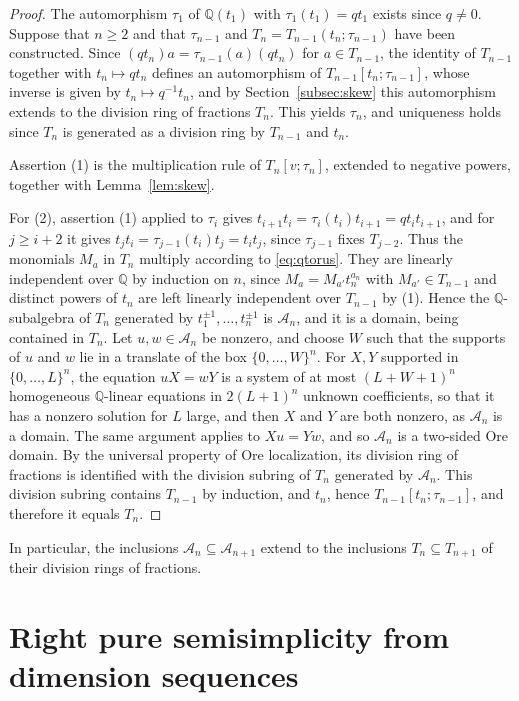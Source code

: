 \documentclass[11pt,a4paper]{amsart}
\numberwithin{equation}{section}
\newcommand{\Q}{\mathbb{Q}}
\begin{document}
\begin{proof}
The automorphism $\tau_1$ of $\Q(t_1)$ with $\tau_1(t_1)=qt_1$ exists since $q\ne0$. Suppose that $n\ge2$ and that $\tau_{n-1}$ and $T_n=T_{n-1}(t_n;\tau_{n-1})$ have been constructed. Since $(qt_n)a=\tau_{n-1}(a)(qt_n)$ for $a\in T_{n-1}$, the identity of $T_{n-1}$ together with $t_n\mapsto qt_n$ defines an automorphism of $T_{n-1}[t_n;\tau_{n-1}]$, whose inverse is given by $t_n\mapsto q^{-1}t_n$, and by Section~\ref{subsec:skew} this automorphism extends to the division ring of fractions $T_n$. This yields $\tau_n$, and uniqueness holds since $T_n$ is generated as a division ring by $T_{n-1}$ and $t_n$.

Assertion (1) is the multiplication rule of $T_n[v;\tau_n]$, extended to negative powers, together with Lemma~\ref{lem:skew}.

For (2), assertion (1) applied to $\tau_i$ gives $t_{i+1}t_i=\tau_i(t_i)t_{i+1}=qt_it_{i+1}$, and for $j\ge i+2$ it gives $t_jt_i=\tau_{j-1}(t_i)t_j=t_it_j$, since $\tau_{j-1}$ fixes $T_{j-2}$. Thus the monomials $M_a$ in $T_n$ multiply according to \eqref{eq:qtorus}. They are linearly independent over $\Q$ by induction on $n$, since $M_a=M_{a'}t_n^{a_n}$ with $M_{a'}\in T_{n-1}$ and distinct powers of $t_n$ are left linearly independent over $T_{n-1}$ by (1). Hence the $\Q$-subalgebra of $T_n$ generated by $t_1^{\pm1},\dots,t_n^{\pm1}$ is $\mathcal A_n$, and it is a domain, being contained in $T_n$. Let $u,w\in\mathcal A_n$ be nonzero, and choose $W$ such that the supports of $u$ and $w$ lie in a translate of the box $\{0,\dots,W\}^n$. For $X,Y$ supported in $\{0,\dots,L\}^n$, the equation $uX=wY$ is a system of at most $(L+W+1)^n$ homogeneous $\Q$-linear equations in $2(L+1)^n$ unknown coefficients, so that it has a nonzero solution for $L$ large, and then $X$ and $Y$ are both nonzero, as $\mathcal A_n$ is a domain. The same argument applies to $Xu=Yw$, and so $\mathcal A_n$ is a two-sided Ore domain. By the universal property of Ore localization, its division ring of fractions is identified with the division subring of $T_n$ generated by $\mathcal A_n$. This division subring contains $T_{n-1}$ by induction, and $t_n$, hence $T_{n-1}[t_n;\tau_{n-1}]$, and therefore it equals $T_n$.
\end{proof}

In particular, the inclusions $\mathcal A_n\subseteq\mathcal A_{n+1}$ extend to the inclusions $T_n\subseteq T_{n+1}$ of their division rings of fractions.

\section{Right pure semisimplicity from dimension sequences}\label{sec:crit}
\end{document}
